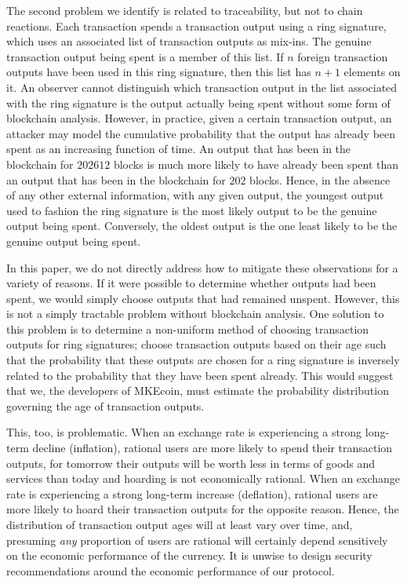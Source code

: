 \documentclass[12pt,english]{mrl}
\theoremstyle{definition}
\numberwithin{equation}{section}
\numberwithin{figure}{section}
\numberwithin{equation}{section}
\numberwithin{equation}{section}
\numberwithin{figure}{section}
\begin{document}
The second problem we identify is related to traceability, but not to chain reactions.  Each transaction spends a transaction output using a ring signature, which uses an associated list of transaction outputs as mix-ins. The genuine transaction output being spent is a member of this list. If $n$ foreign transaction outputs have been used in this ring signature, then this list has $n+1$ elements on it. An observer cannot distinguish which transaction output in the list associated with the ring signature is the output actually being spent without some form of blockchain analysis. However, in practice, given a certain transaction output, an attacker may model the cumulative probability that the output has already been spent as an increasing function of time. An output that has been in the blockchain for $202612$ blocks is much more likely to have already been spent than an output that has been in the blockchain for $202$ blocks. Hence, in the absence of any other external information, with any given output, the youngest output used to fashion the ring signature is the most likely output to be the genuine output being spent. Conversely, the oldest output is the one least likely to be the genuine output being spent. 

In this paper, we do not directly address how to mitigate these observations for a variety of reasons. If it were possible to determine whether outputs had been spent, we would simply choose outputs that had remained unspent. However, this is not a simply tractable problem without blockchain analysis. One solution to this problem is to determine a non-uniform method of choosing transaction outputs for ring signatures; choose transaction outputs based on their age such that the probability that these outputs are chosen for a ring signature is inversely related to the probability that they have been spent already. This would suggest that we, the developers of MKEcoin, must estimate the probability distribution governing the age of transaction outputs. 

This, too, is problematic. When an exchange rate is experiencing a strong long-term decline (inflation), rational users are more likely to spend their transaction outputs, for tomorrow their outputs will be worth less in terms of goods and services than today and hoarding is not economically rational. When an exchange rate is experiencing a strong long-term increase (deflation), rational users are more likely to hoard their transaction outputs for the opposite reason. Hence, the distribution of transaction output ages will at least vary over time, and, presuming \textit{any} proportion of users are rational will certainly depend sensitively on the economic performance of the currency. It is unwise to design security recommendations around the economic performance of our protocol. 
\end{document}
